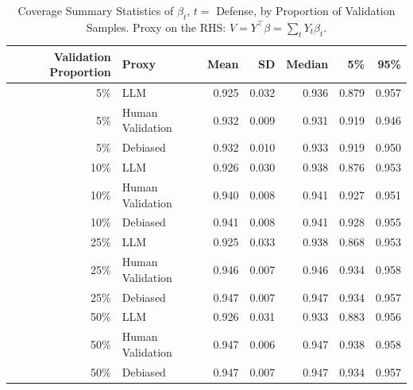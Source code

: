 \begin{table}

\caption{\label{tab:unnamed-chunk-1}Coverage Summary Statistics of $\beta_{t}$, $t=$ Defense, by Proportion of Validation Samples.
      Proxy on the RHS: $V = Y^\top \beta = \sum_{t} Y_t \beta_t$.}
\centering
\begin{tabular}[t]{rlrrrrr}
\toprule
Validation Proportion & Proxy & Mean & SD & Median & 5\% & 95\%\\
\midrule
5\% & LLM & 0.925 & 0.032 & 0.936 & 0.879 & 0.957\\
5\% & Human Validation & 0.932 & 0.009 & 0.931 & 0.919 & 0.946\\
5\% & Debiased & 0.932 & 0.010 & 0.933 & 0.919 & 0.950\\
10\% & LLM & 0.926 & 0.030 & 0.938 & 0.876 & 0.953\\
10\% & Human Validation & 0.940 & 0.008 & 0.941 & 0.927 & 0.951\\
10\% & Debiased & 0.941 & 0.008 & 0.941 & 0.928 & 0.955\\
25\% & LLM & 0.925 & 0.033 & 0.938 & 0.868 & 0.953\\
25\% & Human Validation & 0.946 & 0.007 & 0.946 & 0.934 & 0.958\\
25\% & Debiased & 0.947 & 0.007 & 0.947 & 0.934 & 0.957\\
50\% & LLM & 0.926 & 0.031 & 0.933 & 0.883 & 0.956\\
50\% & Human Validation & 0.947 & 0.006 & 0.947 & 0.938 & 0.958\\
50\% & Debiased & 0.947 & 0.007 & 0.947 & 0.934 & 0.957\\
\bottomrule
\end{tabular}
\end{table}
